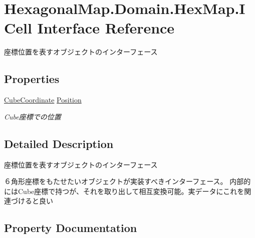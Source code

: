 \hypertarget{interface_hexagonal_map_1_1_domain_1_1_hex_map_1_1_i_cell}{}\section{Hexagonal\+Map.\+Domain.\+Hex\+Map.\+I\+Cell Interface Reference}
\label{interface_hexagonal_map_1_1_domain_1_1_hex_map_1_1_i_cell}


座標位置を表すオブジェクトのインターフェース  


\subsection*{Properties}
\begin{DoxyCompactItemize}
\item 
\mbox{\hyperlink{struct_hexagonal_map_1_1_domain_1_1_hex_map_1_1_cube_coordinate}{Cube\+Coordinate}} \mbox{\hyperlink{interface_hexagonal_map_1_1_domain_1_1_hex_map_1_1_i_cell_a881db0f314539d891b60631bae9a46ae}{Position}}
\begin{DoxyCompactList}\small\item\em Cube座標での位置 \end{DoxyCompactList}\end{DoxyCompactItemize}


\subsection{Detailed Description}
座標位置を表すオブジェクトのインターフェース 

６角形座標をもたせたいオブジェクトが実装すべきインターフェース。 内部的には\+Cube座標で持つが、それを取り出して相互変換可能。実データにこれを関連づけると良い 

\subsection{Property Documentation}
\mbox{\label{interface_hexagonal_map_1_1_domain_1_1_hex_map_1_1_i_cell_a881db0f314539d891b60631bae9a46ae}} 
